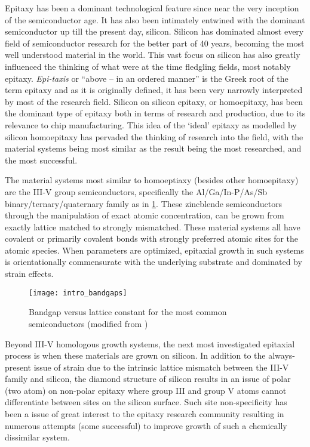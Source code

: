 Epitaxy has been a dominant technological feature since near the very inception of the semiconductor age.
It has also been intimately entwined with the dominant semiconductor up till the present day, silicon.
Silicon has dominated almost every field of semiconductor research for the better part of 40 years, becoming the most well understood material in the world.
This vast focus on silicon has also greatly influenced the thinking of what were at the time fledgling fields, most notably epitaxy.
\emph{Epi-taxis} or ``above -- in an ordered manner'' is the Greek root of the term epitaxy and as it is originally defined, it has been very narrowly interpreted by most of the research field.
Silicon on silicon epitaxy, or homoepitaxy, has been the dominant type of epitaxy both in terms of research and production, due to its relevance to chip manufacturing.
This idea of the `ideal' epitaxy as modelled by silicon homoepitaxy has pervaded the thinking of research into the field, with the material systems being most similar as the result being the most researched, and the most successful.

The material systems most similar to homoeptiaxy (besides other homoepitaxy) are the III-V group semiconductors, specifically the Al/Ga/In-P/As/Sb binary/ternary/quaternary family as in \cref{fig:intro_bandgaps}.
These zincblende semiconductors through the manipulation of exact atomic concentration, can be grown from exactly lattice matched to strongly mismatched. These material systems all have covalent or primarily covalent bonds with strongly preferred atomic sites for the atomic species.
When parameters are optimized, epitaxial growth in such systems is orientationally commensurate with the underlying substrate and dominated by strain effects.

\begin{figure}
    \centering
    \texttt{[image: intro\_bandgaps]}
    \caption[Bandgap versus lattice constant]{\label{fig:intro_bandgaps}Bandgap versus lattice constant for the most common semiconductors (modified from \cite{lattice-constant-diagram})}
\end{figure}

Beyond III-V homologous growth systems, the next most investigated epitaxial process is when these materials are grown on silicon.
In addition to the always-present issue of strain due to the intrinsic lattice mismatch between the III-V family and silicon, the diamond structure of silicon results in an issue of polar (two atom) on non-polar epitaxy\cite{Kroemer1987} where group III and group V atoms cannot differentiate between sites on the silicon surface.
Such site non-specificity has been a issue of great interest to the epitaxy research community resulting in numerous attempts (some successful)\cite{Kroemer1987} to improve growth of such a chemically dissimilar system.

